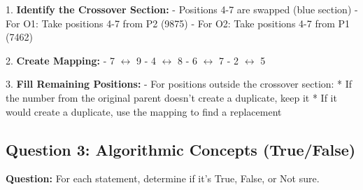 1. \textbf{Identify the Crossover Section:}
   - Positions 4-7 are swapped (blue section)
   - For O1: Take positions 4-7 from P2 (9875)
   - For O2: Take positions 4-7 from P1 (7462)

2. \textbf{Create Mapping:}
   - 7 \( \leftrightarrow \) 9
   - 4 \( \leftrightarrow \) 8
   - 6 \( \leftrightarrow \) 7
   - 2 \( \leftrightarrow \) 5

3. \textbf{Fill Remaining Positions:}
   - For positions outside the crossover section:
     * If the number from the original parent doesn't create a duplicate, keep it
     * If it would create a duplicate, use the mapping to find a replacement

\subsection{Question 3: Algorithmic Concepts (True/False)}
\textbf{Question:} For each statement, determine if it's True, False, or Not sure.


